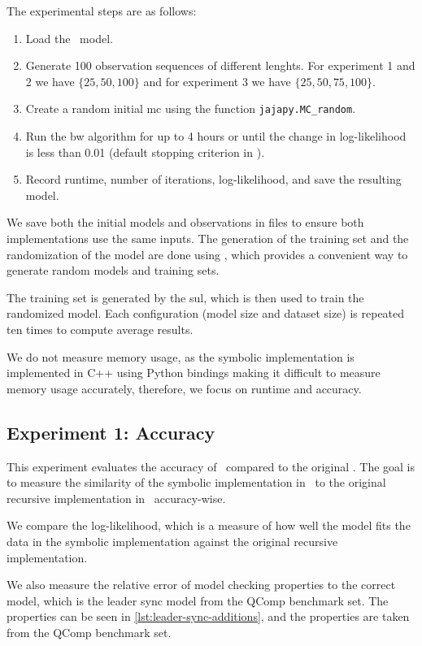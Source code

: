 The experimental steps are as follows:

\begin{enumerate}
    \item Load the \Prism\ model.
    \item Generate 100 observation sequences of different lenghts. For experiment 1 and 2 we have $\{25, 50, 100\}$ and for experiment 3 we have $\{25, 50, 75, 100\}$.
    \item Create a random initial \gls{mc} using the function \texttt{jajapy.MC\_random}.
    \item Run the \gls{bw} algorithm for up to 4 hours or until the change in log-likelihood is less than 0.01 (default stopping criterion in \Jajapy).
    \item Record runtime, number of iterations, log-likelihood, and save the resulting model.
\end{enumerate}

We save both the initial models and observations in files to ensure both implementations use the same inputs.
The generation of the training set and the randomization of the model are done using \Jajapy, which provides a convenient way to generate random models and training sets.

The training set is generated by the \gls{sul}, which is then used to train the randomized model.
Each configuration (model size and dataset size) is repeated ten times to compute average results.

We do not measure memory usage, as the symbolic implementation is implemented in C++ using Python bindings making it difficult to measure memory usage accurately, therefore, we focus on runtime and accuracy.


\subsection{Experiment 1: Accuracy}\label{sec:exp_accuracy}
This experiment evaluates the accuracy of \Cupaal\ compared to the original \Jajapy.
The goal is to measure the similarity of the symbolic implementation in \Cupaal\ to the original recursive implementation in \Jajapy\ accuracy-wise.

We compare the log-likelihood, which is a measure of how well the model fits the data in the symbolic implementation against the original recursive implementation.

We also measure the relative error of model checking properties to the correct model, which is the leader sync model from the QComp benchmark set.
The properties can be seen in \autoref{lst:leader-sync-additions}, and the properties are taken from the QComp benchmark set.

